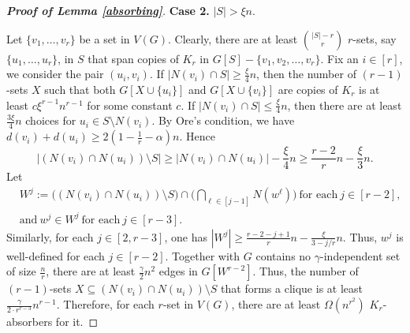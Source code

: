 \documentclass[11pt, a4paper]{article}
\theoremstyle{definition}
\newcommand{\<}{\subseteq}
\begin{document}
\begin{proof}[\bf Proof of Lemma \ref{absorbing}]

\medskip
{\bf Case 2.} $|S|> \xi n$. 
\medskip

Let $\{v_1,\ldots,v_r\}$ be a set in $V(G)$. Clearly, there are at least $\binom{|S|-r}{r}$ $r$-sets, say $\{u_1,\ldots,u_r\}$,  in $S$ that span copies of $K_r$ in $G[S]-\{v_1,v_2,\ldots,v_r\}$. 
Fix an $i\in [r]$, we consider the pair $(u_i,v_i)$. %
If $|N(v_i)\cap S|\ge \frac{\xi}{4}n$, then the number of $(r-1)$-sets $X$ such that both $G[X\cup \{u_i\}]$ and $G[X\cup \{v_i\}]$ are copies of $K_r$ is at least $c\xi^{r-1}n^{r-1}$ for some constant $c$. %
If $|N(v_i)\cap S|\le \frac{\xi}{4}n$, then there are at least $\frac{3\xi}{4}n$ choices for $u_i\in S\setminus N(v_i)$. By Ore's condition, we have $d(v_i)+d(u_i)\ge 2(1-\frac{1}{r}-\alpha)n$. Hence 
$$
|(N(v_i)\cap N(u_i))\setminus S|\ge |N(v_i)\cap N(u_i)|-\frac{\xi}{4}n\geq \frac{r-2}{r}n-\frac{\xi}{3} n.
$$
Let   
\begin{align*}
&W^j:=\big((N(v_i)\cap N(u_i))\setminus S\big)\cap \big(\bigcap_{\ell\in [j-1]}N(w^{\ell})\big)\ \text{for each}\ j\in [r-2],\\
&\text{and}\ w^j\in W^j\ \text{for each}\ j\in [r-3].
\end{align*}
Similarly, for each $j\in [2,r-3]$, one has $|W^j|\geq \frac{r-2-j+1}{r}n-\frac{\xi}{3-j/r} n$. Thus, $w^j$ is well-defined for each $j\in [r-2]$. %
Together with $G$ contains no $\gamma$-independent set of size $\frac{n}{r}$, there are at least $\frac{\gamma}{2}n^2$ edges in $G[W^{r-2}]$. Thus, the number of $(r-1)$-sets $X\subseteq (N(v_i)\cap N(u_i))\setminus S$ that forms a clique  is at least $\frac{\gamma}{2\cdot r^{r-3}}n^{r-1}$. %
Therefore, for each $r$-set  in $V(G)$, there are at least $\Omega(n^{r^2})$ $K_r$-absorbers for it.



\end{proof}
\end{document}
